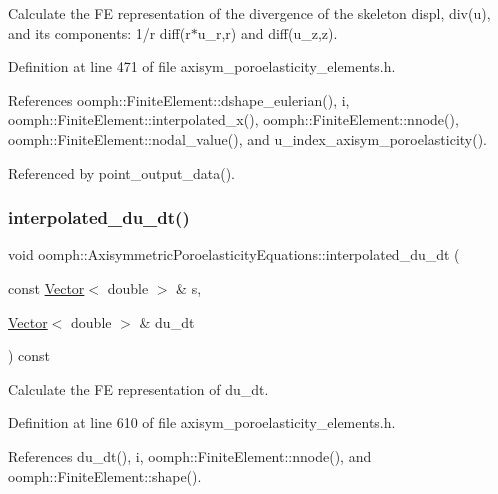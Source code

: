 Calculate the FE representation of the divergence of the skeleton displ, div(u), and its components\+: 1/r diff(r$\ast$u\+\_\+r,r) and diff(u\+\_\+z,z). 

Definition at line 471 of file axisym\+\_\+poroelasticity\+\_\+elements.\+h.



References oomph\+::\+Finite\+Element\+::dshape\+\_\+eulerian(), i, oomph\+::\+Finite\+Element\+::interpolated\+\_\+x(), oomph\+::\+Finite\+Element\+::nnode(), oomph\+::\+Finite\+Element\+::nodal\+\_\+value(), and u\+\_\+index\+\_\+axisym\+\_\+poroelasticity().



Referenced by point\+\_\+output\+\_\+data().

\mbox{\label{classoomph_1_1AxisymmetricPoroelasticityEquations_aaab8e8f97840da4446dc4dd6949fc668}} 
\subsubsection{\texorpdfstring{interpolated\+\_\+du\+\_\+dt()}{interpolated\_du\_dt()}}
{\footnotesize\ttfamily void oomph\+::\+Axisymmetric\+Poroelasticity\+Equations\+::interpolated\+\_\+du\+\_\+dt (\begin{DoxyParamCaption}\item[{const \hyperlink{classoomph_1_1Vector}{Vector}$<$ double $>$ \&}]{s,  }\item[{\hyperlink{classoomph_1_1Vector}{Vector}$<$ double $>$ \&}]{du\+\_\+dt }\end{DoxyParamCaption}) const\hspace{0.3cm}{\ttfamily [inline]}}



Calculate the FE representation of du\+\_\+dt. 



Definition at line 610 of file axisym\+\_\+poroelasticity\+\_\+elements.\+h.



References du\+\_\+dt(), i, oomph\+::\+Finite\+Element\+::nnode(), and oomph\+::\+Finite\+Element\+::shape().



